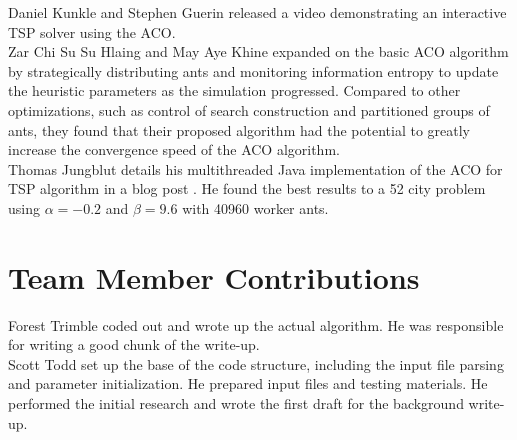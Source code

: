 \documentclass[twocolumn]{article}
\begin{document}
Daniel Kunkle and Stephen Guerin released a video \cite{youtube:aco}
demonstrating an interactive TSP solver using the ACO. \\

Zar Chi Su Su Hlaing and May Aye Khine \cite{ipcsit:aco} expanded on the basic 
ACO algorithm by strategically distributing ants and monitoring information 
entropy to update the heuristic parameters as the simulation progressed. 
Compared to other optimizations, such as control of search construction and 
partitioned groups of ants, they found that their proposed algorithm had the 
potential to greatly increase the convergence speed of the ACO algorithm. \\

Thomas Jungblut details his multithreaded Java implementation of the ACO for TSP
algorithm in a blog post \cite{jungblut:aco}. He found the best results to a 52
city problem using $\alpha=-0.2$ and $\beta=9.6$ with 40960 worker ants.

\section{Team Member Contributions}

\noindent Forest Trimble coded out and wrote up the actual algorithm. He was 
responsible for writing a good chunk of the write-up. \\

\noindent Scott Todd set up the base of the code structure, including the input
file parsing and parameter initialization. He prepared input files and testing
materials. He performed the initial research and wrote the first draft for the
background write-up.

\nocite{*}


\end{document}
